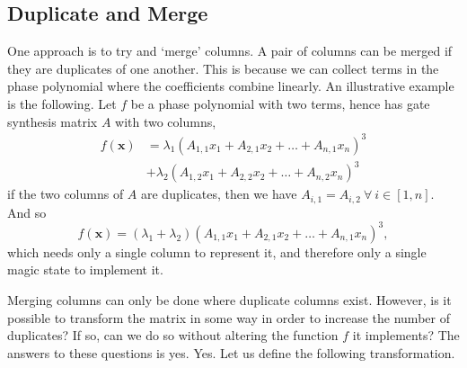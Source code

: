 \documentclass[11pt,a4paper]{article}
\begin{document}
	
	\subsection{Duplicate and Merge}
	One approach is to try and `merge' columns. A pair of columns can be merged if they are duplicates of one another. This is because we can collect terms in the phase polynomial where the coefficients combine linearly. An illustrative example is the following. Let $f$ be a phase polynomial with two terms, hence has gate synthesis matrix $A$ with two columns,
	\begin{align}
	f(\mathbf{x}) &= \lambda_1  (A_{1,1}x_1 + A_{2,1}x_2 + \dots + A_{n,1}x_n)^3 \\ &+ \lambda_2  (A_{1,2}x_1 + A_{2,2}x_2 + \dots + A_{n,2}x_n)^3
	\end{align}
	if the two columns of $A$ are duplicates, then we have $A_{i,1}=A_{i,2} \ \forall \ i \in [1,n]$. And so
	\begin{equation}
	f(\mathbf{x}) = (\lambda_1 + \lambda_2)  (A_{1,1}x_1 + A_{2,1}x_2 + \dots + A_{n,1}x_n)^3,
	\end{equation}
	which needs only a single column to represent it, and therefore only a single magic state to implement it.
	
	Merging columns can only be done where duplicate columns exist. However, is it possible to transform the matrix in some way in order to increase the number of duplicates? If so, can we do so without altering the function $f$ it implements? The answers to these questions is yes. Yes. Let us define the following transformation.
	
\end{document}
